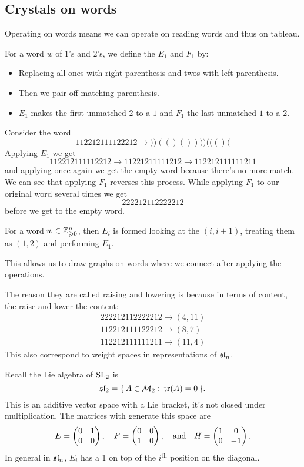 \documentclass[12pt]{memoir}
\begin{document}
\subsection{Crystals on words}

Operating on words means we can operate on reading words and thus on tableau.

\begin{Def}
    For a word $w$ of 1's and 2's, we define the  $E_1$ and  $F_1$ by:
    \begin{itemize}
        \itemsep=-0.4em
        \item Replacing all ones with right parenthesis and twos with left parenthesis.
        \item Then we pair off matching parenthesis.
        \item $E_1$ makes the first unmatched $2$ to a $1$ and $F_1$ the last unmatched $1$ to a $2$. %
    \end{itemize}
\end{Def}
\begin{Ex}
    Consider the word
    $$112212111122212\to))(()())))((()($$
    Applying $E_1$ we get 
    $$112212111112212\to11221211111212\to112212111111211$$
    and applying once again we get the empty word because there's no more match. We can see that applying $F_1$ reverses this process. While applying $F_1$ to our original word several times we get 
    $$222212112222212$$
    before we get to the empty word.
\end{Ex}

\begin{Def}
    For a word $w\in\mathbb{Z}^n_{\geqslant 0}$, then $E_i$ is formed looking at the $(i,i+1)$, treating them as $(1,2)$ and performing $E_1$. 
\end{Def}

This allows us to draw graphs on words where we connect after applying the operations.\par 
The reason they are called raising and lowering is because in terms of content, the raise and lower the content:
\begin{align*}
    222212112222212\to(4,11)\\
    112212111122212\to(8,7)\\
    112212111111211\to(11,4)
\end{align*}
This also correspond to weight spaces in representations of $\mathfrak{sl}_n$. 

\begin{Rmk}
    Recall the Lie algebra of $\operatorname{SL}_2$ is 
    $$\gsl_2=\set{A\in\cM_2\:\ \tr(A)=0}.$$
    This is an additive vector space with a Lie bracket, it's not closed under multiplication. The matrices with generate this space are 
    $$E=\begin{pmatrix} 0 & 1 \\ 0 & 0 \end{pmatrix},\quad F=\begin{pmatrix} 0 & 0 \\ 1 & 0 \end{pmatrix},\quad\text{and}\quad H=\begin{pmatrix} 1 & 0 \\ 0 & -1 \end{pmatrix}.$$
    In general in $\mathfrak{sl}_n$, $E_i$ has a 1 on top of the $i^{\text{th}}$ position on the diagonal.
\end{Rmk}
\end{document}
